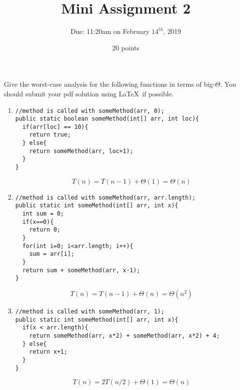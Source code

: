 \documentclass[12pt]{article}
\begin{document}
 
\title{Mini Assignment 2}
\author{Due: 11:20am on February $14^{th}$, 2019}
\date{20 points}
\maketitle

Give the worst-case analysis for the following functions in terms of big-$\Theta$. You should submit your pdf solution using \LaTeX\ if possible.
    \begin{enumerate}
    	\item 
\begin{lstlisting}
//method is called with someMethod(arr, 0);
public static boolean someMethod(int[] arr, int loc){
  if(arr[loc] == 10){
    return true;
  } else{
    return someMethod(arr, loc+1);
  }
}
\end{lstlisting}
$$T(n)=T(n-1)+\Theta(1)=\boxed{\Theta(n)}$$
\newpage
    	\item 
\begin{lstlisting}
//method is called with someMethod(arr, arr.length);
public static int someMethod(int[] arr, int x){
  int sum = 0;
  if(x==0){
    return 0;
  }
  for(int i=0; i<arr.length; i++){
    sum = arr[i];
  }
  return sum + someMethod(arr, x-1);
}
\end{lstlisting}
$$T(n)=T(n-1)+\Theta(n)=\boxed{\Theta(n^{2})}$$
    	\item 
\begin{lstlisting}
//method is called with someMethod(arr, 1);
public static int someMethod(int[] arr, int x){
  if(x < arr.length){
    return someMethod(arr, x*2) + someMethod(arr, x*2) + 4;    
  } else{
    return x+1;
  }
}
\end{lstlisting}
$$T(n)=2T(n/2)+\Theta(1)=\boxed{\Theta(n)}$$

    \end{enumerate}
\end{document}
